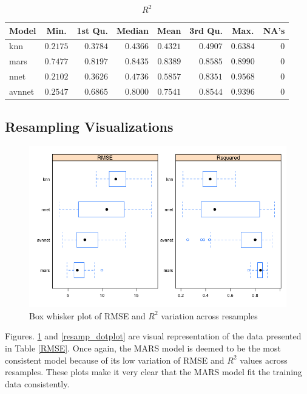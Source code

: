 \documentclass[letterpaper,12pt,titlepage,oneside,final]{report}
\begin{document}
                \begin{table}[!hp]
                \begin{center}
                \begin{tabular}{lrrrrrrr}
                \hline\hline
                \multicolumn{1}{l}{Model}&\multicolumn{1}{c}{Min.}&\multicolumn{1}{c}{1st Qu.}&\multicolumn{1}{c}{Median}&\multicolumn{1}{c}{Mean}&\multicolumn{1}{c}{3rd Qu.}&\multicolumn{1}{c}{Max.}&\multicolumn{1}{c}{NA's}\tabularnewline
                \hline
                knn&$0.2175$&$0.3784$&$0.4366$&$0.4321$&$0.4907$&$0.6384$&$0$\tabularnewline
                mars&$0.7477$&$0.8197$&$0.8435$&$0.8389$&$0.8585$&$0.8990$&$0$\tabularnewline
                nnet&$0.2102$&$0.3626$&$0.4736$&$0.5857$&$0.8351$&$0.9568$&$0$\tabularnewline
                avnnet&$0.2547$&$0.6865$&$0.8000$&$0.7541$&$0.8544$&$0.9396$&$0$\tabularnewline
                \hline
                \end{tabular}
                \caption{$R^2$\label{Rsquared}} 
                \end{center}
                \end{table}
        \subsection {Resampling Visualizations}
            \begin{figure}[!h]
                \centering
                \includegraphics[width=\textwidth]{resamp_bwplot}
                \caption{Box whisker plot of RMSE and $R^2$ variation across resamples}
                \label{resamp_bwplot}
            \end{figure}
            Figures. \ref{resamp_bwplot} and \ref{resamp_dotplot} are visual representation of the data presented in Table \ref{RMSE}. Once again, the MARS model is deemed to be the most consistent model because of its low variation of RMSE and $R^2$ values across resamples. These plots make it very clear that the MARS model fit the training data consistently.
            
\end{document}
